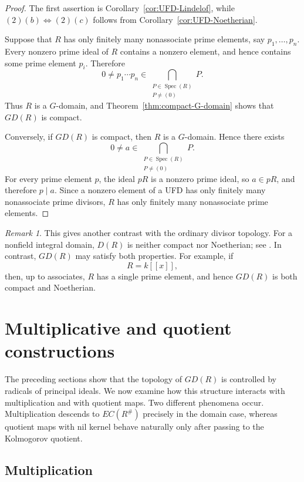 \documentclass[11pt]{amsart}
\theoremstyle{plain}
\theoremstyle{definition}
\theoremstyle{remark}
\newtheorem{remark}[theorem]{Remark}
\numberwithin{equation}{section}
\begin{document}
\begin{proof}
	The first assertion is
	Corollary~\ref{cor:UFD-Lindelof}, while
	$(2)(b)\Leftrightarrow(2)(c)$ follows from
	Corollary~\ref{cor:UFD-Noetherian}.
	
	Suppose that $R$ has only finitely many nonassociate prime elements,
	say $p_1,\ldots,p_n$. Every nonzero prime ideal of $R$ contains a
	nonzero element, and hence contains some prime element $p_i$.
	Therefore
	\[
	0\neq p_1\cdots p_n
	\in
	\bigcap_{\substack{P\in\operatorname{Spec}(R)\\P\neq(0)}}P.
	\]
	Thus $R$ is a $G$-domain, and
	Theorem~\ref{thm:compact-G-domain} shows that $GD(R)$ is compact.
	
	Conversely, if $GD(R)$ is compact, then $R$ is a $G$-domain. Hence
	there exists
	\[
	0\neq a\in
	\bigcap_{\substack{P\in\operatorname{Spec}(R)\\P\neq(0)}}P.
	\]
	For every prime element $p$, the ideal $pR$ is a nonzero prime ideal,
	so $a\in pR$, and therefore $p\mid a$. Since a nonzero element of a
	UFD has only finitely many nonassociate prime divisors, $R$ has only
	finitely many nonassociate prime elements.
\end{proof}

\begin{remark}
	This gives another contrast with the ordinary divisor topology. For a
	nonfield integral domain, $D(R)$ is neither compact nor Noetherian;
	see \cite[Proposition~11 and Theorem~7]{YigitKoc}. In contrast,
	$GD(R)$ may satisfy both properties. For example, if
	\[
	R=k[[x]],
	\]
	then, up to associates, $R$ has a single prime element, and hence
	$GD(R)$ is both compact and Noetherian.
\end{remark}

\section{Multiplicative and quotient constructions}

The preceding sections show that the topology of $GD(R)$ is controlled
by radicals of principal ideals. We now examine how this structure
interacts with multiplication and with quotient maps. Two different
phenomena occur. Multiplication descends to $EC(R^\#)$ precisely in
the domain case, whereas quotient maps with nil kernel behave
naturally only after passing to the Kolmogorov quotient.

\subsection{Multiplication}
\end{document}

